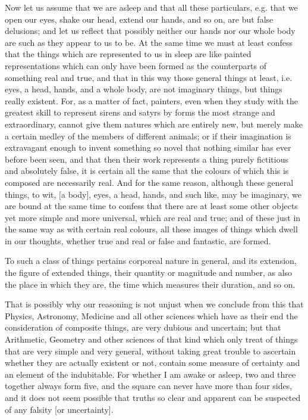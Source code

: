 Now let us assume that we are asleep and that all these particulars,
e.g. that we open our eyes, shake our head, extend our hands, and so
on, are but false delusions; and let us reflect that possibly neither
our hands nor our whole body are such as they appear to us to be. At
the same time we must at least confess that the things which are
represented to us in sleep are like painted representations which can
only have been formed as the counterparts of something real and true,
and that in this way those general things at least, i.e. eyes, a head,
hands, and a whole body, are not imaginary things, but things really
existent. For, as a matter of fact, painters, even when they study
with the greatest skill to represent sirens and satyrs by forms the
most strange and extraordinary, cannot give them natures which are
entirely new, but merely make a certain medley of the members of
different animals; or if their imagination is extravagant enough to
invent something so novel that nothing similar has ever before been
seen, and that then their work represents a thing purely fictitious
and absolutely false, it is certain all the same that the colours of
which this is composed are necessarily real. And for the same reason,
although these general things, to wit, [a body], eyes, a head, hands,
and such like, may be imaginary, we are bound at the same time to
confess that there are at least some other objects yet more simple and
more universal, which are real and true; and of these just in the same
way as with certain real colours, all these images of things which
dwell in our thoughts, whether true and real or false and fantastic,
are formed.

To such a class of things pertains corporeal nature in general, and
its extension, the figure of extended things, their quantity or
magnitude and number, as also the place in which they are, the time
which measures their duration, and so on.

That is possibly why our reasoning is not unjust when we
conclude from this that Physics, Astronomy, Medicine and all other
sciences which have as their end the consideration of composite
things, are very dubious and uncertain; but that Arithmetic,
Geometry and other sciences of that kind which only treat of things
that are very simple and very general, without taking great trouble to
ascertain whether they are actually existent or not, contain some
measure of certainty and an element of the indubitable. For whether I
am awake or asleep, two and three together always form five, and the
square can never have more than four sides, and it does not seem
possible that truths so clear and apparent can be suspected of any
falsity [or uncertainty].

